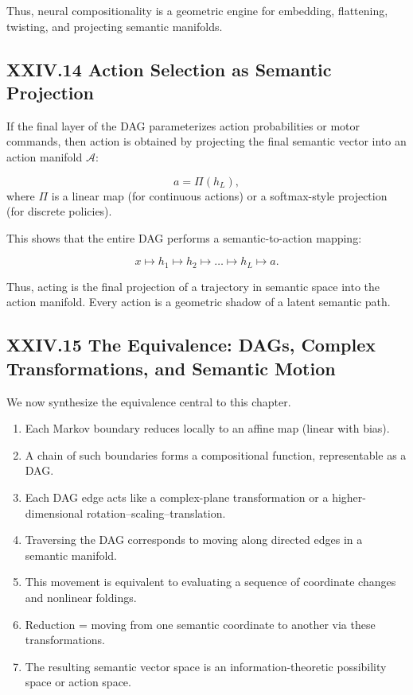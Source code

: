 \documentclass[11pt,letterpaper]{article}
\begin{document}
Thus, neural compositionality is a geometric engine for embedding, flattening, twisting, and projecting semantic manifolds.

\subsection{XXIV.14 Action Selection as Semantic Projection}

If the final layer of the DAG parameterizes action probabilities or motor commands, then action is obtained by projecting the final semantic vector into an action manifold $\mathcal{A}$:

\[
a = \Pi( h_L ),
\]
where $\Pi$ is a linear map (for continuous actions) or a softmax-style projection (for discrete policies).

This shows that the entire DAG performs a semantic-to-action mapping:

\[
x \mapsto h_1 \mapsto h_2 \mapsto \dots \mapsto h_L \mapsto a.
\]

Thus, acting is the final projection of a trajectory in semantic space into the action manifold.  
Every action is a geometric shadow of a latent semantic path.

\subsection{XXIV.15 The Equivalence: DAGs, Complex Transformations, and Semantic Motion}

We now synthesize the equivalence central to this chapter.

\begin{enumerate}
    \item Each Markov boundary reduces locally to an affine map (linear with bias).
    \item A chain of such boundaries forms a compositional function, representable as a DAG.
    \item Each DAG edge acts like a complex-plane transformation or a higher-dimensional rotation–scaling–translation.
    \item Traversing the DAG corresponds to moving along directed edges in a semantic manifold.
    \item This movement is equivalent to evaluating a sequence of coordinate changes and nonlinear foldings.
    \item Reduction = moving from one semantic coordinate to another via these transformations.
    \item The resulting semantic vector space is an information-theoretic possibility space or action space.
\end{enumerate}
\end{document}
